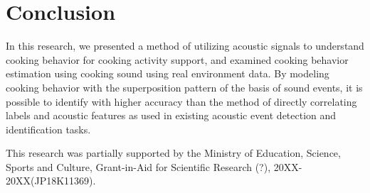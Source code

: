 \documentclass[sigchi]{acmart}
\begin{document}
\section{Conclusion}
In this research, we presented a method of utilizing acoustic signals to understand cooking behavior for cooking activity support, and examined cooking behavior estimation using cooking sound using real environment data.
By modeling cooking behavior with the superposition pattern of the basis of sound events, it is possible to identify with higher accuracy than the method of directly correlating labels and acoustic features as used in existing acoustic event detection and identification tasks.


\begin{acks}
This research was partially supported by the Ministry of Education, Science, Sports and Culture, Grant-in-Aid for Scientific Research (?), 20XX-20XX(JP18K11369).
\end{acks}

%



%
\end{document}
